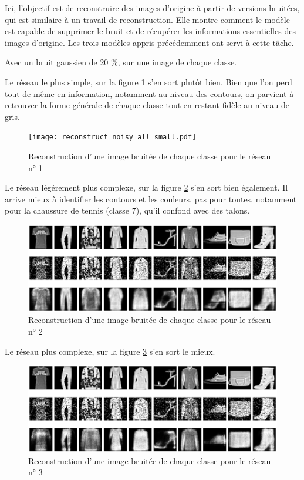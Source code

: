 \documentclass{article}
\begin{document}
Ici, l'objectif est de reconstruire des images d'origine à partir de versions bruitées, qui est similaire à un travail de reconstruction. Elle montre comment le modèle est capable de supprimer le bruit et de récupérer les informations essentielles des images d'origine. Les trois modèles appris précédemment ont servi à cette tâche.

Avec un bruit gaussien de 20 \%, sur une image de chaque classe. 

Le réseau le plus simple, sur la figure \ref*{fig:reconstruct_noisy_all_small} s'en sort plutôt bien. Bien que l'on perd tout de même en information, notamment au niveau des contours, on parvient à retrouver la forme générale de chaque classe tout en restant fidèle au niveau de gris.

\begin{figure}[htbp]
    \centering
    \texttt{[image: reconstruct\_noisy\_all\_small.pdf]}
    \caption{Reconstruction d'une image bruitée de chaque classe pour le réseau n° 1}
    \label{fig:reconstruct_noisy_all_small}
\end{figure}

Le réseau légérement plus complexe, sur la figure \ref*{fig:reconstruct_noisy_all_medium} s'en sort bien également. Il arrive mieux à identifier les contours et les couleurs, pas pour toutes, notamment pour la chaussure de tennis (classe 7), qu'il confond avec des talons. 

\begin{figure}[htbp]
    \centering
    \includegraphics*[width=\textwidth]{reconstruct_noisy_all_medium.pdf}
    \caption{Reconstruction d'une image bruitée de chaque classe pour le réseau n° 2}
    \label{fig:reconstruct_noisy_all_medium}
\end{figure}

Le réseau plus complexe, sur la figure \ref*{fig:reconstruct_noisy_all_big} s'en sort le mieux.

\begin{figure}[htbp]
    \centering
    \includegraphics*[width=\textwidth]{reconstruct_noisy_all_big.pdf}
    \caption{Reconstruction d'une image bruitée de chaque classe pour le réseau n° 3}
    \label{fig:reconstruct_noisy_all_big}
\end{figure}
\end{document}
